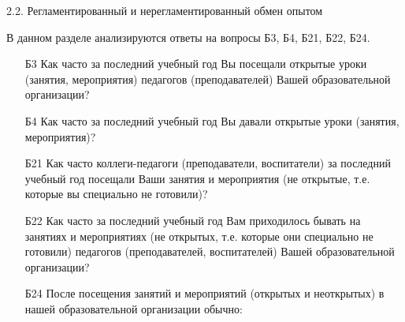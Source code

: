 \begin{frame}{2.2. Регламентированный и нерегламентированный обмен опытом}

\tiny

В данном разделе анализируются ответы на вопросы Б3, Б4, Б21, Б22, Б24.
\bigskip

\begin{itemize}

\item [Б3] Как часто за последний учебный год Вы посещали открытые уроки (занятия, мероприятия) педагогов (преподавателей)  Вашей образовательной организации?

\item [Б4] Как часто за последний учебный год Вы давали открытые уроки (занятия, мероприятия)?

\item [Б21] Как часто коллеги-педагоги (преподаватели, воспитатели) за последний учебный год посещали Ваши занятия и мероприятия (не открытые, т.е. которые вы специально не готовили)?

\item [Б22] Как часто за последний учебный год Вам приходилось бывать на занятиях и мероприятиях (не открытых, т.е. которые они специально не готовили) педагогов (преподавателей, воспитателей) Вашей образовательной организации?

\item [Б24] После посещения занятий  и мероприятий (открытых и неоткрытых)  в нашей образовательной организации  обычно:

\end{itemize}

\end{frame}


